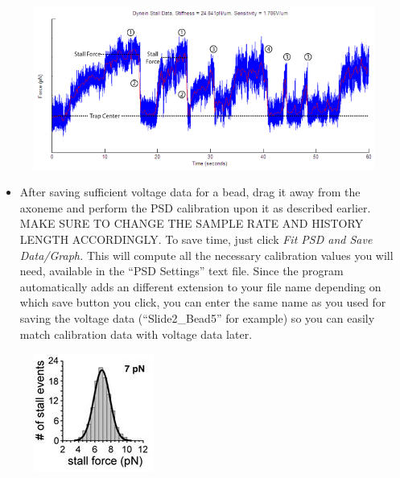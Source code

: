 \documentclass{../lab}
\begin{document}
\begin{figure}[h]
    \centering
    \href{http://experimentationlab.berkeley.edu/sites/default/files/images/Dynein-Stall-Graph_No-Y-Axis.gif}{\includegraphics[width=0.5\linewidth]{images/Dynein-Stall-Graph_No-Y-Axis.png}}
    \caption{}
    \label{fig:Dynein-Stall-Graph_No-Y-Axis}
\end{figure}

\begin{itemize}
    \item After saving sufficient voltage data for a bead, drag it away from the axoneme and perform the PSD calibration upon it as described earlier. MAKE SURE TO CHANGE THE SAMPLE RATE AND HISTORY LENGTH ACCORDINGLY. To save time, just click \emph{Fit PSD and Save Data/Graph.} This will compute all the necessary calibration values you will need, available in the ``PSD Settings'' text file. Since the program automatically adds an different extension to your file name depending on which save button you click, you can enter the same name as you used for saving the voltage data (``Slide2\_Bead5'' for example) so you can easily match calibration data with voltage data later.

\end{itemize}


\begin{figure}[h]
    \centering
    \href{http://experimentationlab.berkeley.edu/sites/default/files/images/150px-Gennerich_Stall_Data.jpg}{\includegraphics[width=0.5\linewidth]{images/150px-Gennerich_Stall_Data.jpg}}
    \caption{}
    \label{fig:150px-Gennerich_Stall_Data}
\end{figure}
\end{document}
